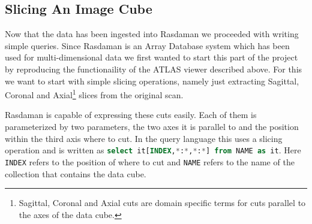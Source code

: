 \label{sec:queries}

\subsection{Slicing An Image Cube}

Now that the data has been ingested into Rasdaman we proceeded with writing simple queries. Since Rasdaman is an Array Database system which has been used for multi-dimensional data we first wanted to start this part of the project by reproducing the functionaility of the ATLAS viewer described above. For this we want to start with simple slicing operations, namely just extracting Sagittal, Coronal and Axial\footnote{Sagittal, Coronal and Axial cuts are domain specific terms for cuts parallel to the axes of the data cube. } slices from the original scan.

Rasdaman is capable of expressing these cuts easily. Each of them is parameterized by two parameters, the two axes it is parallel to and the position within the third axis where to cut. In the query language this uses a slicing operation and is written as \lstinline[morekeywords={NAME,INDEX},language=SQL]{select it[INDEX,*:*,*:*] from NAME as it}. Here \lstinline{INDEX} refers to the position of where to cut and \lstinline{NAME} refers to the name of the collection that contains the data cube.

